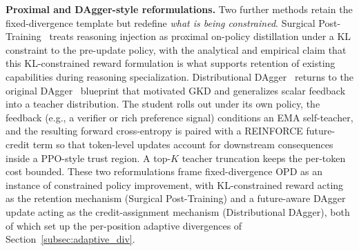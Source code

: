 \documentclass{article} %
\begin{document}
\textbf{Proximal and DAgger-style reformulations.} Two further methods retain the fixed-divergence template but redefine \emph{what is being constrained}. Surgical Post-Training~\citep{2603.01683} treats reasoning injection as proximal on-policy distillation under a KL constraint to the pre-update policy, with the analytical and empirical claim that this KL-constrained reward formulation is what supports retention of existing capabilities during reasoning specialization. Distributional DAgger~\citep{2606.05152} returns to the original DAgger~\citep{1011.0686} blueprint that motivated GKD and generalizes scalar feedback into a teacher distribution. The student rolls out under its own policy, the feedback (e.g., a verifier or rich preference signal) conditions an EMA self-teacher, and the resulting forward cross-entropy is paired with a REINFORCE future-credit term so that token-level updates account for downstream consequences inside a PPO-style trust region. A top-$K$ teacher truncation keeps the per-token cost bounded. These two reformulations frame fixed-divergence OPD as an instance of constrained policy improvement, with KL-constrained reward acting as the retention mechanism (Surgical Post-Training) and a future-aware DAgger update acting as the credit-assignment mechanism (Distributional DAgger), both of which set up the per-position adaptive divergences of Section~\ref{subsec:adaptive_div}.
\end{document}
